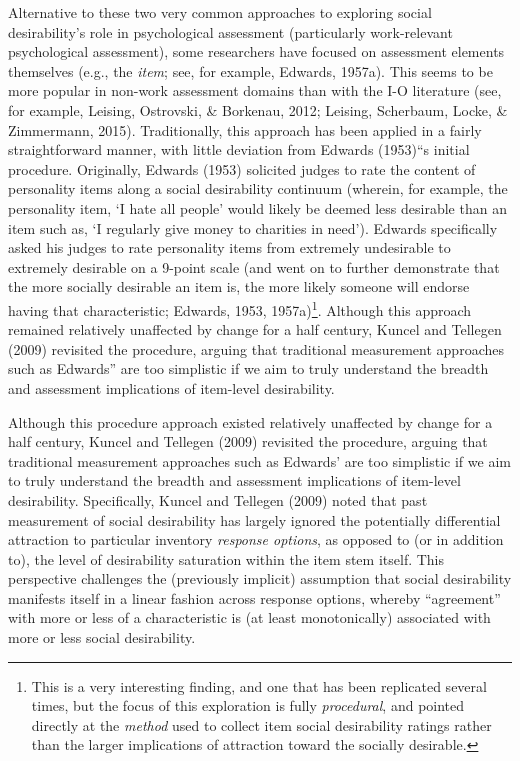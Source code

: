 \documentclass[
  english,
  ,jou]{apa6}
\begin{document}
Alternative to these two very common approaches to exploring social desirability's role in psychological assessment (particularly work-relevant psychological assessment), some researchers have focused on assessment elements themselves (e.g., the \emph{item}; see, for example, Edwards, 1957a). This seems to be more popular in non-work assessment domains than with the I-O literature (see, for example, Leising, Ostrovski, \& Borkenau, 2012; Leising, Scherbaum, Locke, \& Zimmermann, 2015). Traditionally, this approach has been applied in a fairly straightforward manner, with little deviation from Edwards (1953)\enquote{s initial procedure. Originally, Edwards (1953) solicited judges to rate the content of personality items along a social desirability continuum (wherein, for example, the personality item, \enquote{I hate all people} would likely be deemed less desirable than an item such as, \enquote{I regularly give money to charities in need}). Edwards specifically asked his judges to rate personality items from extremely undesirable to extremely desirable on a 9-point scale (and went on to further demonstrate that the more socially desirable an item is, the more likely someone will endorse having that characteristic; Edwards, 1953, 1957a)\footnote{This is a very interesting finding, and one that has been replicated several times, but the focus of this exploration is fully \emph{procedural}, and pointed directly at the \emph{method} used to collect item social desirability ratings rather than the larger implications of attraction toward the socially desirable.}. Although this approach remained relatively unaffected by change for a half century, Kuncel and Tellegen (2009) revisited the procedure, arguing that traditional measurement approaches such as Edwards} are too simplistic if we aim to truly understand the breadth and assessment implications of item-level desirability.

Although this procedure approach existed relatively unaffected by change for a half century, Kuncel and Tellegen (2009) revisited the procedure, arguing that traditional measurement approaches such as Edwards' are too simplistic if we aim to truly understand the breadth and assessment implications of item-level desirability. Specifically, Kuncel and Tellegen (2009) noted that past measurement of social desirability has largely ignored the potentially differential attraction to particular inventory \emph{response options}, as opposed to (or in addition to), the level of desirability saturation within the item stem itself. This perspective challenges the (previously implicit) assumption that social desirability manifests itself in a linear fashion across response options, whereby \enquote{agreement} with more or less of a characteristic is (at least monotonically) associated with more or less social desirability.
\end{document}
